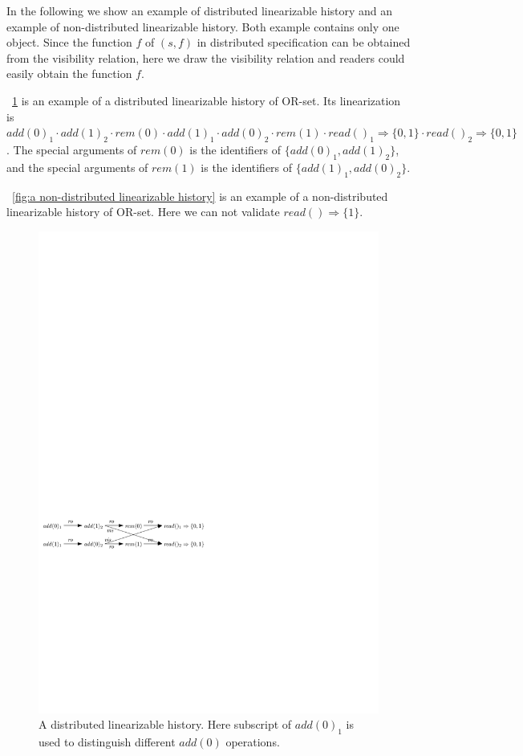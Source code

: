 
In the following we show an example of distributed linearizable history and an example of non-distributed linearizable history. Both example contains only one object. Since the function $f$ of $(s,f)$ in distributed specification can be obtained from the visibility relation, here we draw the visibility relation and readers could easily obtain the function $f$.

\figurename~\ref{fig:a distributed linearizable history} is an example of a distributed linearizable history of OR-set. Its linearization is $\mathit{add}(0)_1 \cdot \mathit{add}(1)_2 \cdot \mathit{rem}(0) \cdot \mathit{add}(1)_1 \cdot \mathit{add}(0)_2 \cdot \mathit{rem}(1) \cdot \mathit{read}()_1 \Rightarrow \{0,1\} \cdot \mathit{read}()_2 \Rightarrow \{0,1\}$. The special arguments of $\mathit{rem}(0)$ is the identifiers of $\{ \mathit{add}(0)_1, \mathit{add}(1)_2 \}$, and the special arguments of $\mathit{rem}(1)$ is the identifiers of $\{ \mathit{add}(1)_1, \mathit{add}(0)_2 \}$.

\figurename~\ref{fig:a non-distributed linearizable history} is an example of a non-distributed linearizable history of OR-set. Here we can not validate $\mathit{read}() \Rightarrow \{ 1 \}$.

\begin{figure}[t]
  \centering
  \includegraphics[width=0.7 \textwidth]{figures/PIC-Example-LinHis.pdf}
  \caption{A distributed linearizable history. Here subscript of $\mathit{add}(0)_1$ is used to distinguish different $\mathit{add}(0)$ operations.}
  \label{fig:a distributed linearizable history}
\end{figure}



